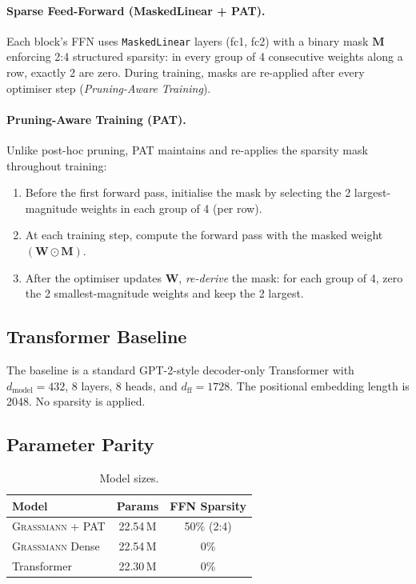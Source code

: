 \documentclass[conference]{IEEEtran}
\newcommand{\grassmann}{\textsc{Grassmann}}
\newcommand{\pat}{\textsc{PAT}}
\begin{document}
\paragraph{Sparse Feed-Forward (MaskedLinear + \pat{}).}
Each block's FFN uses \texttt{MaskedLinear} layers (fc1, fc2) with a
binary mask $\mathbf{M}$ enforcing 2:4 structured sparsity: in every
group of 4 consecutive weights along a row, exactly 2 are zero. During
training, masks are re-applied after every optimiser step
(\emph{Pruning-Aware Training}).

\paragraph{Pruning-Aware Training (\pat{}).}
Unlike post-hoc pruning, \pat{} maintains and re-applies the sparsity
mask throughout training:
\begin{enumerate}[leftmargin=*,topsep=2pt,itemsep=1pt]
  \item Before the first forward pass, initialise the mask by selecting
        the 2 largest-magnitude weights in each group of 4 (per row).
  \item At each training step, compute the forward pass with the masked
        weight $(\mathbf{W} \odot \mathbf{M})$.
  \item After the optimiser updates $\mathbf{W}$, \emph{re-derive} the
        mask: for each group of 4, zero the 2 smallest-magnitude weights
        and keep the 2 largest.
\end{enumerate}

\subsection{Transformer Baseline}

The baseline is a standard GPT-2-style decoder-only Transformer with
$d_{\text{model}} = 432$, 8 layers, 8 heads, and $d_{\text{ff}} = 1728$.
The positional embedding length is 2048. No sparsity is applied.

\subsection{Parameter Parity}

\begin{table}[htbp]
\centering
\caption{Model sizes.}
\label{tab:params}
\small
\begin{tabular}{@{}lcc@{}}
\toprule
\textbf{Model} & \textbf{Params} & \textbf{FFN Sparsity} \\
\midrule
\grassmann{} + \pat{}   & 22.54\,M & 50\% (2:4) \\
\grassmann{} Dense      & 22.54\,M & 0\%  \\
Transformer             & 22.30\,M & 0\%  \\
\bottomrule
\end{tabular}
\end{table}
\end{document}
